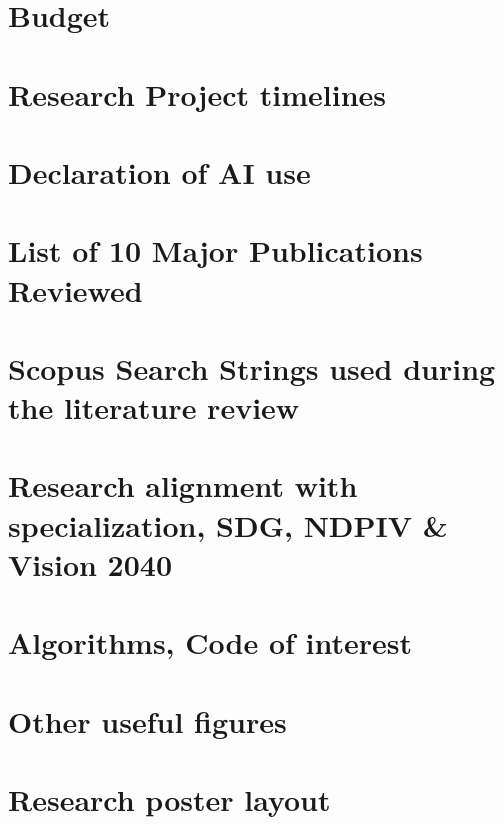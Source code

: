 
\chapter{Budget  }
\label{App:budget}



\chapter{Research Project timelines }
\label{App:research-project-timelines}



\chapter{Declaration of AI use }
\label{App:AI-use-declaration}



\chapter{List of 10 Major Publications Reviewed}
\label{App:major-journal-publications-reviewed}



\chapter{Scopus Search Strings used during the literature review}
\label{App:scopus-search-strings}



\chapter{Research alignment with specialization, SDG, NDPIV \& Vision 2040 }
\label{App:research-allignment-with-national-and-global-agenda}



\chapter{Algorithms, Code of interest}
\label{App:algorithms-and-code}



\chapter{Other useful figures}
\label{App:figures-other}


\chapter{Research poster layout }
\label{App:research-poster-layout}

